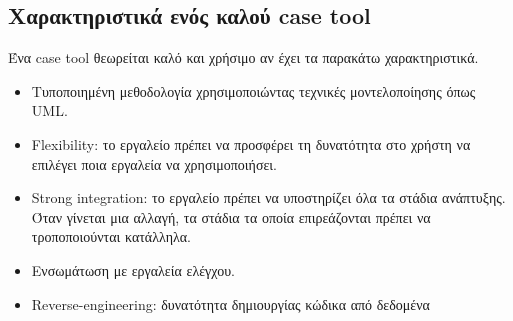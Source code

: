 \subsection{Χαρακτηριστικά ενός καλού case tool}
Ένα case tool θεωρείται καλό και χρήσιμο αν έχει τα παρακάτω χαρακτηριστικά.
\begin{itemize}
	\item Τυποποιημένη μεθοδολογία χρησιμοποιώντας τεχνικές μοντελοποίησης όπως UML.
	\item Flexibility: το εργαλείο πρέπει να προσφέρει τη δυνατότητα στο χρήστη να επιλέγει ποια εργαλεία να χρησιμοποιήσει.
	\item Strong integration: το εργαλείο πρέπει να υποστηρίζει όλα τα στάδια ανάπτυξης. Όταν γίνεται μια αλλαγή, τα στάδια τα οποία επιρεάζονται πρέπει να τροποποιούνται κατάλληλα.
	\item Ενσωμάτωση με εργαλεία ελέγχου.
	\item Reverse-engineering: δυνατότητα δημιουργίας κώδικα από δεδομένα
\end{itemize}

	
